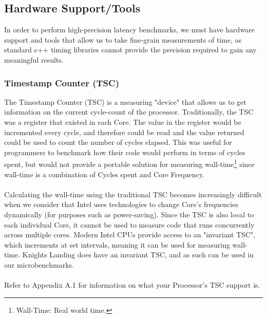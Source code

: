 \documentclass[bsc,frontabs,twoside,singlespacing,parskip,deptreport]{infthesis}     %
\begin{document}
\subsection{Hardware Support/Tools}
{
In order to perform high-precision latency benchmarks, we must have hardware support and tools that allow us to take fine-grain measurements of time, as standard c++ timing libraries cannot provide the precision required to gain any meaningful results.

\subsubsection{Timestamp Counter (TSC)}
{
The Timestamp Counter (TSC) is a measuring "device" that allows us to get information on the current cycle-count of the processor. Traditionally, the TSC was a register that existed in each Core. The value in the register would be incremented every cycle, and therefore could be read and the value returned could be used to count the number of cycles elapsed. This was useful for programmers to benchmark how their code would perform in terms of cycles spent, but would not provide a portable solution for measuring wall-time\footnote{Wall-Time: Real world time.} since wall-time is a combination of Cycles spent and Core Frequency. \\
\\
Calculating the wall-time using the traditional TSC becomes increasingly difficult when we consider that Intel uses technologies to change Core's frequencies dynamically (for purposes such as power-saving). Since the TSC is also local to each individual Core, it cannot be used to measure code that runs concurrently across multiple cores. Modern Intel CPUs provide access to an "invariant TSC", which increments at set intervals, meaning it can be used for measuring wall-time. Knights Landing does have an invariant TSC, and as such can be used in our microbenchmarks. \\
\\
Refer to Appendix A.1 for information on what your Processor's TSC support is.
}

}
\end{document}
